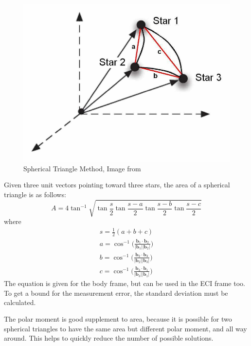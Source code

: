 \documentclass[12pt,a4paper,twoside]{article}
\begin{document}
\begin{figure}[ht]
\includegraphics[scale=0.29]{spherical_triangle_method.jpg}
\centering
\caption[Spherical Triangle Method]{Spherical Triangle Method, Image from \citet{cole2004fast}}
\label{fig:spherical_triangle_method}
\end{figure}
Given three unit vectors pointing toward three stars, the area of a spherical triangle is as follows:
\begin{equation}
A = 4\tan^{-1}\sqrt{\tan\frac{s}{2}\tan\frac{s-a}{2}\tan\frac{s-b}{2}\tan\frac{s-c}{2}}
\end{equation}
where
\begin{subequations}
\begin{align*}
s = \frac{1}{2}(a + b + c) \\
a = \cos^{-1} \bigg(\frac{\bm{b}_1 \cdot \bm{b}_2}{|\bm{b}_1||\bm{b}_2|}\bigg) \\
b = \cos^{-1} \bigg(\frac{\bm{b}_2 \cdot \bm{b}_3}{|\bm{b}_2||\bm{b}_3|}\bigg) \\
c = \cos^{-1} \bigg(\frac{\bm{b}_3 \cdot \bm{b}_1}{|\bm{b}_3||\bm{b}_1|}\bigg) 
\end{align*}
\end{subequations}
The equation is given for the body frame, but can be used in the ECI frame too. To get a bound for the measurement error, the standard deviation must be calculated.

The polar moment is good supplement to area, because it is possible for two spherical triangles to have the same area but different polar moment, and all way around. This helps to quickly reduce the number of possible solutions.
\end{document}
